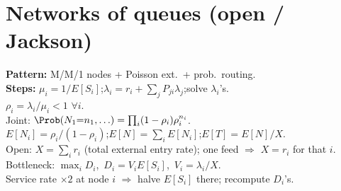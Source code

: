 \section*{Networks of queues (open / Jackson)}
\textbf{Pattern:} M/M/1 nodes + Poisson ext.\ + prob.\ routing.\\
\textbf{Steps:} $\mu_i=1/E[S_i]$;\quad $\lambda_i=r_i+\sum_j P_{ji}\lambda_j$;\quad solve $\lambda_i$'s.\\
$\rho_i=\lambda_i/\mu_i<1$ $\forall i$.\\
Joint: $\Prob(N_1{=}n_1,\ldots)=\prod_i (1-\rho_i)\rho_i^{n_i}$.\\
$E[N_i]=\rho_i/(1-\rho_i)$;\quad $E[N]=\sum_i E[N_i]$;\quad $E[T]=E[N]/X$.\\
Open: $X=\sum_i r_i$ (total external entry rate); one feed $\Rightarrow$ $X=r_i$ for that $i$.\\
Bottleneck: $\max_i D_i$,\ $D_i=V_i E[S_i]$,\ $V_i=\lambda_i/X$.\\
Service rate $\times2$ at node $i$ $\Rightarrow$ halve $E[S_i]$ there; recompute $D_i$'s.
